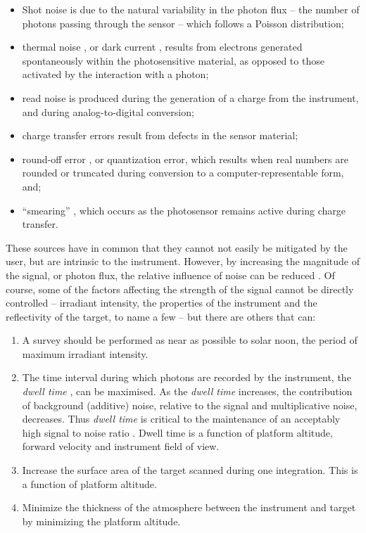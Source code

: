 \begin{itemize}
\item Shot noise \cite{Barducci2007} is due to the natural variability in the photon flux -- the number of photons passing through the sensor -- which follows a Poisson distribution;
\item thermal noise \cite{Barducci2007}, or dark current \cite{Rogass2011}, results from electrons generated spontaneously within the photosensitive material, as opposed to those activated by the interaction with a photon;
\item read noise \cite{Barducci2007} is produced during the generation of a charge from the instrument, and during analog-to-digital conversion;
\item charge transfer errors \cite{Barducci2007} result from defects in the sensor material;
\item round-off error \cite{Barducci2007}, or quantization error, which results when real numbers are rounded or truncated during conversion to a computer-representable form, and;
\item ``smearing'' \cite{Barducci2007,Ruyten1999}, which occurs as the photosensor remains active during charge transfer.
\end{itemize}

These sources have in common that they cannot not easily be mitigated by the user, but are intrinsic to the instrument. However, by increasing the magnitude of the signal, or photon flux, the relative influence of noise can be reduced \cite{Dor2012}. Of course, some of the factors affecting the strength of the signal cannot be directly controlled -- irradiant intensity, the properties of the instrument and the reflectivity of the target, to name a few -- but there are others that can:

\begin{enumerate}
\item A survey should be performed as near as possible to solar noon, the period of maximum irradiant intensity. 
\item The time interval during which photons are recorded by the instrument, the \emph{dwell time} \cite{Gupta2018,Goetz1985,Dor2012}, can be maximised. As the \emph{dwell time} increases, the contribution of background (additive) noise, relative to the signal and multiplicative noise, decreases. Thus \emph{dwell time} is critical to the maintenance of an acceptably high signal to noise ratio \cite{F.MarkDanson1996,Avery1992,Rogass2014}. Dwell time is a function of platform altitude, forward velocity and instrument field of view.
\item Increase the surface area of the target scanned during one integration. This is a function of platform altitude.
\item Minimize the thickness of the atmosphere between the instrument and target by minimizing the platform altitude.
\end{enumerate}

